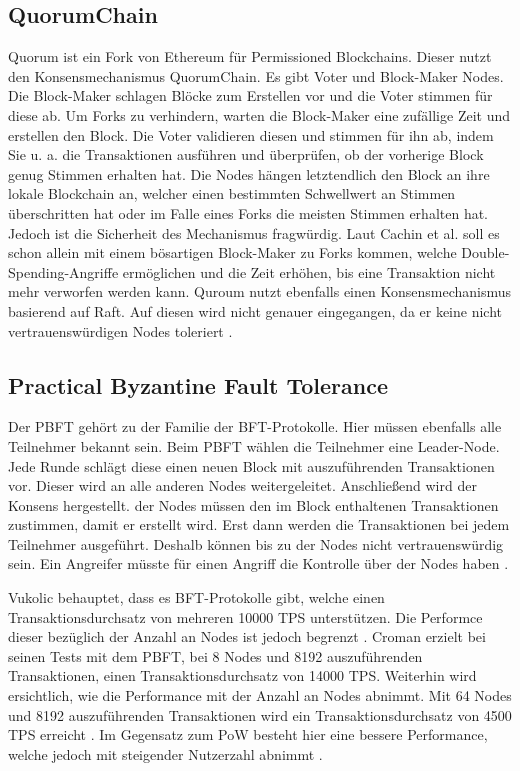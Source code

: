 \subsection{QuorumChain}
Quorum ist ein Fork von Ethereum für Permissioned Blockchains. Dieser nutzt den Konsensmechanismus QuorumChain. Es gibt Voter und Block-Maker Nodes. Die Block-Maker schlagen Blöcke zum Erstellen vor und die Voter stimmen für diese ab. Um Forks zu verhindern, warten die Block-Maker eine zufällige Zeit und erstellen den Block. Die Voter validieren diesen und stimmen für ihn ab, indem Sie u. a. die Transaktionen ausführen und überprüfen, ob der vorherige Block genug Stimmen erhalten hat. Die Nodes hängen letztendlich den Block an ihre lokale Blockchain an, welcher einen bestimmten Schwellwert an Stimmen überschritten hat oder im Falle eines Forks die meisten Stimmen erhalten hat. Jedoch ist die Sicherheit des Mechanismus fragwürdig. Laut Cachin et al. soll es schon allein mit einem bösartigen Block-Maker zu Forks kommen, welche Double-Spending-Angriffe ermöglichen und die Zeit erhöhen, bis eine Transaktion nicht mehr verworfen werden kann. Quroum nutzt ebenfalls einen Konsensmechanismus basierend auf Raft. Auf diesen wird nicht genauer eingegangen, da er keine nicht vertrauenswürdigen Nodes toleriert \cite{CachinBlockchainConsensusProtocols2017}.

\subsection{Practical Byzantine Fault Tolerance}
Der \acs{PBFT} gehört zu der Familie der \acs{BFT}-Protokolle. Hier müssen ebenfalls alle Teilnehmer bekannt sein. Beim \acs{PBFT} wählen die Teilnehmer eine Leader-Node. Jede Runde schlägt diese einen neuen Block mit auszuführenden Transaktionen vor. Dieser wird an alle anderen Nodes weitergeleitet. Anschließend wird der Konsens hergestellt.  der Nodes müssen den im Block enthaltenen Transaktionen zustimmen, damit er erstellt wird. Erst dann werden die Transaktionen bei jedem Teilnehmer ausgeführt. Deshalb können bis zu  der Nodes nicht vertrauenswürdig sein. Ein Angreifer müsste für einen Angriff die Kontrolle über  der Nodes haben \cite{SukhwaniPerformanceModelingPBFT2017a}\cite{ZhengBlockchainChallengesOpportunities2017}. 

Vukolic behauptet, dass es \acs{BFT}-Protokolle gibt, welche einen Transaktionsdurchsatz von mehreren 10000 \acs{TPS} unterstützen. Die Performce dieser bezüglich der Anzahl an Nodes ist jedoch begrenzt \cite{Vukolicquestscalableblockchain2015}. Croman erzielt bei seinen Tests mit dem PBFT, bei 8 Nodes und 8192 auszuführenden Transaktionen, einen Transaktionsdurchsatz von 14000 \acs{TPS}. Weiterhin wird ersichtlich, wie die Performance mit der Anzahl an Nodes abnimmt. Mit 64 Nodes und 8192 auszuführenden Transaktionen wird ein Transaktionsdurchsatz von 4500 \acs{TPS} erreicht \cite{CromanScalingDecentralizedBlockchains2016}. Im Gegensatz zum \acs{PoW} besteht hier eine bessere Performance, welche jedoch mit steigender Nutzerzahl abnimmt \cite{Vukolicquestscalableblockchain2015}.

